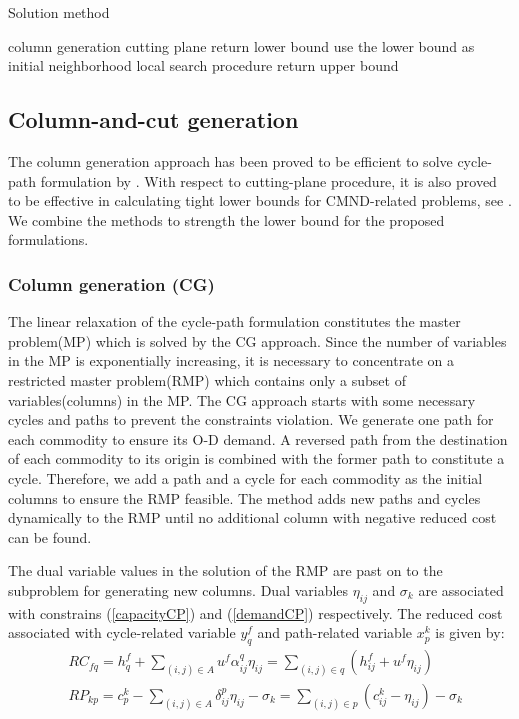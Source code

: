 \documentclass[11pt,nonblindrev,fleqn]{article}
\begin{document}
\vspace{.15in}
\begin{algorithm}[H] \label{Methodology}
\caption{Solution method}
\LinesNumbered
\SetNlSkip{1.2em}
{
    column generation\;
    cutting plane\;
}
return lower bound\;
use the lower bound as initial neighborhood\;
local search procedure\;
return upper bound\;
\end{algorithm}
\subsection{Column-and-cut generation}
The column generation approach has been proved to be efficient to solve cycle-path formulation by \cite{Andersen2011Branch}. With respect to cutting-plane procedure, it is also proved to be effective in calculating tight lower bounds for CMND-related problems, see \cite{Chouman2009Commodity,Chouman2011Commodity,Chouman2015Cutting}. We combine the methods to strength the lower bound for the proposed formulations.

\subsubsection{Column generation (CG)}
The linear relaxation of the cycle-path formulation constitutes the master problem(MP) which is solved by the CG approach. Since the number of variables in the MP is exponentially increasing, it is necessary to concentrate on a restricted master problem(RMP) which contains only a subset of variables(columns) in the MP.  The CG approach starts with some necessary cycles and paths to prevent the constraints violation. We generate one path for each commodity to ensure its O-D demand. A reversed path from the destination of each commodity to its origin is combined with the former path to constitute a cycle. Therefore, we add a path and a cycle for each commodity as the initial columns to ensure the RMP feasible. The method adds new paths and cycles dynamically to the RMP until no additional column with negative reduced cost can be found.

The dual variable values in the solution of the RMP are past on to the subproblem for generating new columns. Dual variables $\eta_{ij}$ and $\sigma_k$ are associated with constrains (\ref{capacityCP}) and (\ref{demandCP}) respectively. The reduced cost associated with cycle-related variable $y_q^f$ and path-related variable $x_p^k$ is given by:
\begin{align}
& RC_{fq} = h_q^f + \sum_{(i,j)\in A} u^f \alpha_{ij}^q \eta_{ij} = \sum_{(i,j)\in q} (h_{ij}^f + u^f \eta_{ij}) \\
& RP_{kp} = c_p^k - \sum_{(i,j)\in A} \delta_{ij}^p \eta_{ij} - \sigma_k = \sum_{(i,j)\in p} (c_{ij}^k - \eta_{ij}) - \sigma_k
\end{align}
\end{document}
